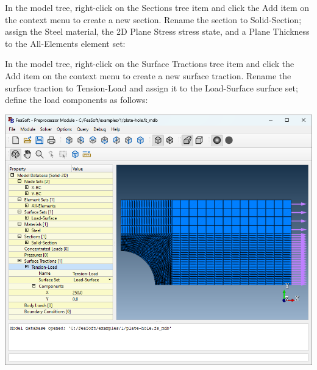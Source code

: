 \documentclass[
    11pt,        %
    a4paper,     %
    final,       %
    fleqn,       %
    notitlepage, %
    onecolumn,   %
    oneside,     %
]{article}
\begin{document}
In the model tree, right-click on the Sections tree item and click the Add item on the context menu to create a new section. Rename the section to Solid-Section; assign the Steel material, the 2D Plane Stress stress state, and a Plane Thickness to the All-Elements element set:
\begin{center}
\end{center}

In the model tree, right-click on the Surface Tractions tree item and click the Add item on the context menu to create a new surface traction. Rename the surface traction to Tension-Load and assign it to the Load-Surface surface set; define the load components as follows:
\begin{center}
\end{center}
\begin{center}
    \includegraphics[scale=0.5]{fig/ui-1-13.png}
\end{center}
\end{document}
